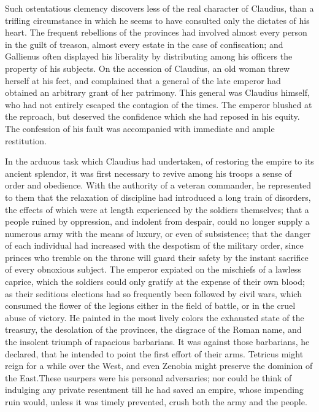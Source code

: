 Such ostentatious clemency discovers less of the real character
of Claudius, than a trifling circumstance in which he seems to
have consulted only the dictates of his heart. The frequent
rebellions of the provinces had involved almost every person in
the guilt of treason, almost every estate in the case of
confiscation; and Gallienus often displayed his liberality by
distributing among his officers the property of his subjects. On
the accession of Claudius, an old woman threw herself at his
feet, and complained that a general of the late emperor had
obtained an arbitrary grant of her patrimony. This general was
Claudius himself, who had not entirely escaped the contagion of
the times. The emperor blushed at the reproach, but deserved the
confidence which she had reposed in his equity. The confession of
his fault was accompanied with immediate and ample restitution.\footnotemark[9]


In the arduous task which Claudius had undertaken, of restoring
the empire to its ancient splendor, it was first necessary to
revive among his troops a sense of order and obedience. With the
authority of a veteran commander, he represented to them that the
relaxation of discipline had introduced a long train of
disorders, the effects of which were at length experienced by the
soldiers themselves; that a people ruined by oppression, and
indolent from despair, could no longer supply a numerous army
with the means of luxury, or even of subsistence; that the danger
of each individual had increased with the despotism of the
military order, since princes who tremble on the throne will
guard their safety by the instant sacrifice of every obnoxious
subject. The emperor expiated on the mischiefs of a lawless
caprice, which the soldiers could only gratify at the expense of
their own blood; as their seditious elections had so frequently
been followed by civil wars, which consumed the flower of the
legions either in the field of battle, or in the cruel abuse of
victory. He painted in the most lively colors the exhausted state
of the treasury, the desolation of the provinces, the disgrace of
the Roman name, and the insolent triumph of rapacious barbarians.
It was against those barbarians, he declared, that he intended to
point the first effort of their arms. Tetricus might reign for a
while over the West, and even Zenobia might preserve the dominion
of the East.\footnotemark[10] These usurpers were his personal adversaries; nor
could he think of indulging any private resentment till he had
saved an empire, whose impending ruin would, unless it was timely
prevented, crush both the army and the people.

